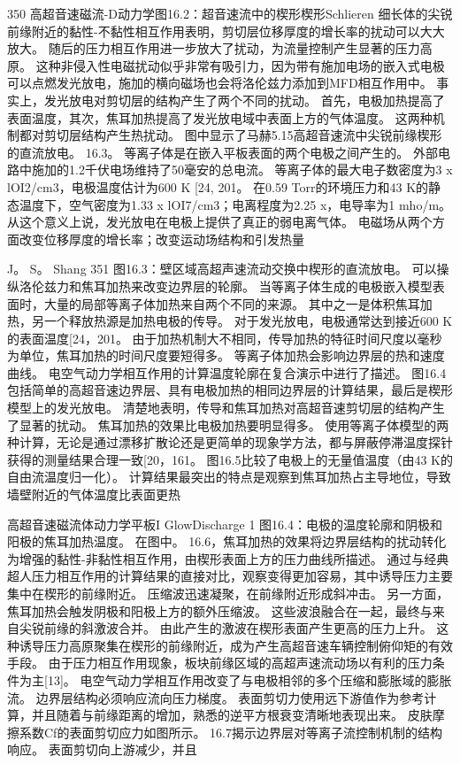 \documentclass[UTF8,11pt,a4paper,openany,fontset=fandol]{ctexbook}
\begin{document}
350 高超音速磁流-D动力学图16.2：超音速流中的楔形楔形Schlieren 细长体的尖锐前缘附近的黏性-不黏性相互作用表明，剪切层位移厚度的增长率的扰动可以大大放大。 随后的压力相互作用进一步放大了扰动，为流量控制产生显著的压力高原。 这种非侵入性电磁扰动似乎非常有吸引力，因为带有施加电场的嵌入式电极可以点燃发光放电，施加的横向磁场也会将洛伦兹力添加到MFD相互作用中。 事实上，发光放电对剪切层的结构产生了两个不同的扰动。 首先，电极加热提高了表面温度，其次，焦耳加热提高了发光放电域中表面上方的气体温度。 这两种机制都对剪切层结构产生热扰动。 图中显示了马赫5.15高超音速流中尖锐前缘楔形的直流放电。 16.3。 等离子体是在嵌入平板表面的两个电极之间产生的。 外部电路中施加的1.2千伏电场维持了50毫安的总电流。 等离子体的最大电子数密度为3 x lOI2/cm3，电极温度估计为600 K [24, 201。 在0.59 Torr的环境压力和43 K的静态温度下，空气密度为1.33 x lOI7/cm3；电离程度为2.25 x，电导率为1 mho/m。 从这个意义上说，发光放电在电极上提供了真正的弱电离气体。 电磁场从两个方面改变位移厚度的增长率；改变运动场结构和引发热量

J。 S。 Shang 351 图16.3：壁区域高超声速流动交换中楔形的直流放电。 可以操纵洛伦兹力和焦耳加热来改变边界层的轮廓。 当等离子体生成的电极嵌入模型表面时，大量的局部等离子体加热来自两个不同的来源。 其中之一是体积焦耳加热，另一个释放热源是加热电极的传导。 对于发光放电，电极通常达到接近600 K的表面温度[24，201。 由于加热机制大不相同，传导加热的特征时间尺度以毫秒为单位，焦耳加热的时间尺度要短得多。 等离子体加热会影响边界层的热和速度曲线。 电空气动力学相互作用的计算温度轮廓在复合演示中进行了描述。 图16.4包括简单的高超音速边界层、具有电极加热的相同边界层的计算结果，最后是楔形模型上的发光放电。 清楚地表明，传导和焦耳加热对高超音速剪切层的结构产生了显著的扰动。 焦耳加热的效果比电极加热要明显得多。 使用等离子体模型的两种计算，无论是通过漂移扩散论还是更简单的现象学方法，都与屏蔽停滞温度探针获得的测量结果合理一致[20，161。 图16.5比较了电极上的无量值温度（由43 K的自由流温度归一化）。 计算结果最突出的特点是观察到焦耳加热占主导地位，导致墙壁附近的气体温度比表面更热

高超音速磁流体动力学平板I GlowDischarge 1 图16.4：电极的温度轮廓和阴极和阳极的焦耳加热温度。 在图中。 16.6，焦耳加热的效果将边界层结构的扰动转化为增强的黏性-非黏性相互作用，由楔形表面上方的压力曲线所描述。 通过与经典超人压力相互作用的计算结果的直接对比，观察变得更加容易，其中诱导压力主要集中在楔形的前缘附近。 压缩波迅速凝聚，在前缘附近形成斜冲击。 另一方面，焦耳加热会触发阴极和阳极上方的额外压缩波。 这些波浪融合在一起，最终与来自尖锐前缘的斜激波合并。 由此产生的激波在楔形表面产生更高的压力上升。 这种诱导压力高原聚集在楔形的前缘附近，成为产生高超音速车辆控制俯仰矩的有效手段。 由于压力相互作用现象，板块前缘区域的高超声速流动场以有利的压力条件为主[13]。 电空气动力学相互作用改变了与电极相邻的多个压缩和膨胀域的膨胀流。 边界层结构必须响应流向压力梯度。 表面剪切力使用远下游值作为参考计算，并且随着与前缘距离的增加，熟悉的逆平方根衰变清晰地表现出来。 皮肤摩擦系数Cf的表面剪切应力如图所示。 16.7揭示边界层对等离子流控制机制的结构响应。 表面剪切向上游减少，并且
\end{document}

